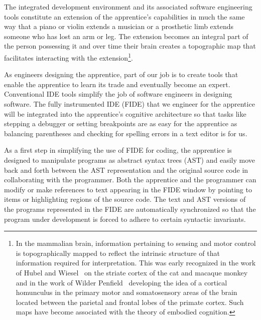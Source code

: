 
The integrated development environment and its associated software engineering tools constitute an extension of the apprentice’s capabilities in much the same way that a piano or violin extends a musician or a prosthetic limb extends someone who has lost an arm or leg. The extension becomes an integral part of the person possessing it and over time their brain creates a topographic map that facilitates interacting with the extension\footnote{%
%
  In the mammalian brain, information pertaining to sensing and motor control is topographically mapped to reflect the intrinsic structure of that information required for interpretation. This was early recognized in the work of Hubel and Wiesel~\cite{HubelandWieselJoP-68,HubelandWieselJoP-62} on the striate cortex of the cat and macaque monkey and in the work of Wilder Penfield~\cite{PenfieldandBoldreyBRAIN-37} developing the idea of a cortical homunculus in the primary motor and somatosensory areas of the brain located between the parietal and frontal lobes of the primate cortex. Such maps have become associated with the theory of embodied cognition.}. 
 
As engineers designing the apprentice, part of our job is to create tools that enable the apprentice to learn its trade and eventually become an expert. Conventional IDE tools simplify the job of software engineers in designing software. The fully instrumented IDE (FIDE) that we engineer for the apprentice will be integrated into the apprentice’s cognitive architecture so that tasks like stepping a debugger or setting breakpoints are as easy for the apprentice as balancing parentheses and checking for spelling errors in a text editor is for us.

As a first step in simplifying the use of FIDE for coding, the apprentice is designed to manipulate programs as abstract syntax trees (AST) and easily move back and forth between the AST representation and the original source code in collaborating with the programmer. Both the apprentice and the programmer can modify or make references to text appearing in the FIDE window by pointing to items or highlighting regions of the source code. The text and AST versions of the programs represented in the FIDE are automatically synchronized so that the program under development is forced to adhere to certain syntactic invariants. 


